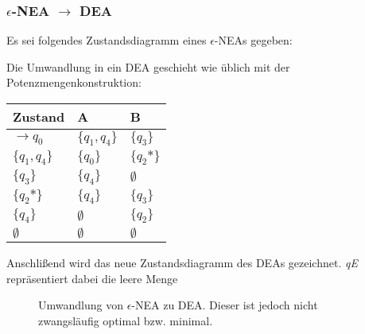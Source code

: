 \subsubsection{$\epsilon$-NEA $\to$ DEA}
Es sei folgendes Zustandsdiagramm eines $\epsilon$-NEAs gegeben:\\
\begin{figure}[H]
    \centering
    \begin{transitiongraph}[fa]
    \end{transitiongraph}
    \label{graph:epsNEA}
\end{figure}
Die Umwandlung in ein DEA geschieht wie üblich mit der Potenzmengenkonstruktion:
\begin{table}[H]
\centering
\begin{tabular}{|l|l|l|}
\hline
Zustand         & A           & B               \\ \hline
$\to q_0$       & $\{q_1,q_4\}$ & $\{q_3\}$           \\ \hline
$\{q_1,q_4\}$     & $\{q_0\}$     & $\{q_2\mbox{*}\}$ \\ \hline
$\{q_3\}$         & $\{q_4\}$     & $\emptyset$     \\ \hline
$\{q_2\mbox{*}\}$ & $\{q_4\}$     & $\{q_3\}$         \\ \hline
$\{q_4\}$         & $\emptyset$ & $\{q_2\}$           \\ \hline
$\emptyset$     & $\emptyset$ & $\emptyset$     \\ \hline
\end{tabular}
\end{table}
Anschlißend wird das neue Zustandsdiagramm des DEAs gezeichnet. \textit{qE} repräsentiert dabei die leere Menge\\
\begin{figure}[H]
    \centering
    \begin{transitiongraph}[fa]
    \end{transitiongraph}
    \caption{Umwandlung von $\epsilon$-NEA zu DEA. Dieser ist jedoch nicht zwangsläufig optimal bzw. minimal.}
\end{figure}